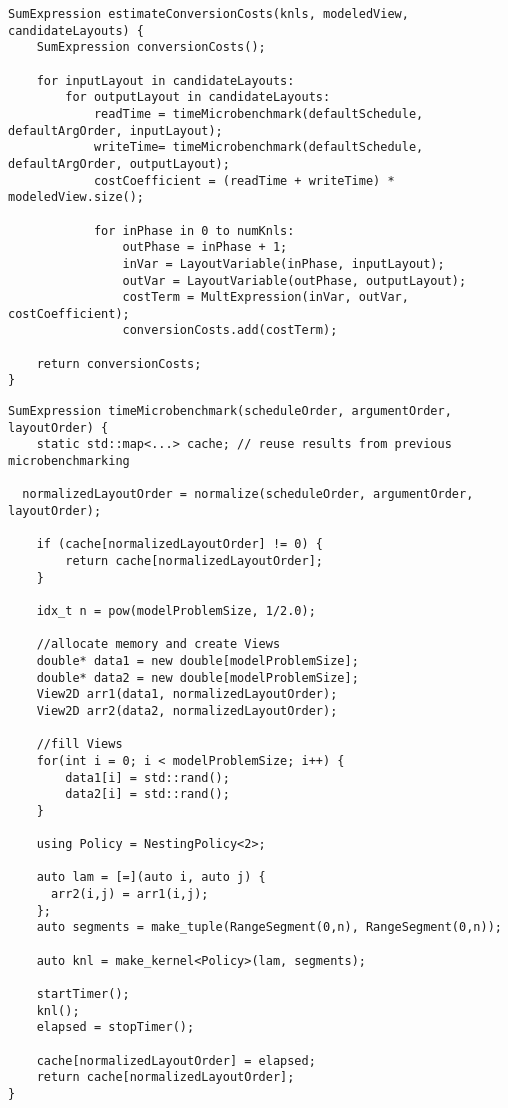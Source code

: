 \begin{lstlisting}[caption={Algorithm for generating the objective function's conversion cost terms.}]
SumExpression estimateConversionCosts(knls, modeledView, candidateLayouts) {
	SumExpression conversionCosts();

	for inputLayout in candidateLayouts:
		for outputLayout in candidateLayouts:
			readTime = timeMicrobenchmark(defaultSchedule, defaultArgOrder, inputLayout);
			writeTime= timeMicrobenchmark(defaultSchedule, defaultArgOrder, outputLayout);
			costCoefficient = (readTime + writeTime) * modeledView.size();

			for inPhase in 0 to numKnls:
				outPhase = inPhase + 1;
				inVar = LayoutVariable(inPhase, inputLayout);
				outVar = LayoutVariable(outPhase, outputLayout);
				costTerm = MultExpression(inVar, outVar, costCoefficient);
				conversionCosts.add(costTerm);
	
	return conversionCosts;
}
\end{lstlisting}

\begin{lstlisting}[caption={Algorithm for microbenchmark timing. Implementation is shown for two-dimensional case. Actual implementation uses template metaprogramming to generalize the dimensionality.}]
SumExpression timeMicrobenchmark(scheduleOrder, argumentOrder, layoutOrder) {
	static std::map<...> cache; // reuse results from previous microbenchmarking

  normalizedLayoutOrder = normalize(scheduleOrder, argumentOrder, layoutOrder);

	if (cache[normalizedLayoutOrder] != 0) {
		return cache[normalizedLayoutOrder];
	}

	idx_t n = pow(modelProblemSize, 1/2.0);

	//allocate memory and create Views
	double* data1 = new double[modelProblemSize];
	double* data2 = new double[modelProblemSize];
	View2D arr1(data1, normalizedLayoutOrder);
	View2D arr2(data2, normalizedLayoutOrder);

	//fill Views
	for(int i = 0; i < modelProblemSize; i++) {
		data1[i] = std::rand();
		data2[i] = std::rand();
	}

	using Policy = NestingPolicy<2>;

	auto lam = [=](auto i, auto j) {
	  arr2(i,j) = arr1(i,j);
	};
	auto segments = make_tuple(RangeSegment(0,n), RangeSegment(0,n));

	auto knl = make_kernel<Policy>(lam, segments);

	startTimer();
	knl();
	elapsed = stopTimer();

	cache[normalizedLayoutOrder] = elapsed;
	return cache[normalizedLayoutOrder];
}
\end{lstlisting}

